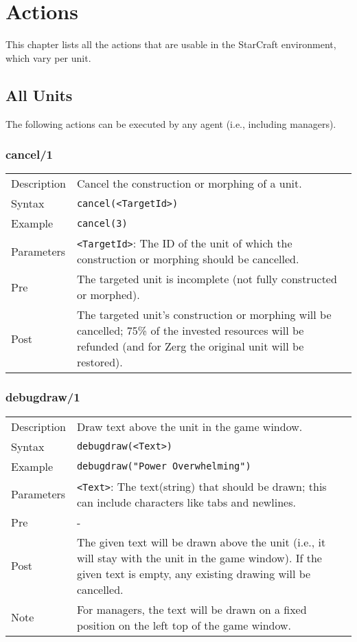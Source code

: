\chapter{Actions}

This chapter lists all the actions that are usable in the StarCraft environment, which vary per unit.

\section{All Units}
The following actions can be executed by any agent (i.e., including managers).

\subsection{cancel/1}
\begin{tabularx}{\textwidth}{lX}
 Description & Cancel the construction or morphing of a unit. \\
 Syntax & \verb|cancel(<TargetId>)| \\
 Example & \verb|cancel(3)| \\
 Parameters & \verb|<TargetId>|: The ID of the unit of which the construction or morphing should be cancelled. \\
 Pre & The targeted unit is incomplete (not fully constructed or morphed). \\
 Post & The targeted unit's construction or morphing will be cancelled; 75\% of the invested resources will be refunded (and for Zerg the original unit will be restored).
\end{tabularx}

\subsection{debugdraw/1}
\begin{tabularx}{\textwidth}{lX}
 Description & Draw text above the unit in the game window. \\
 Syntax & \verb|debugdraw(<Text>)| \\
 Example & \verb|debugdraw("Power Overwhelming")| \\
 Parameters & \verb|<Text>|: The text(string) that should be drawn; this can include characters like tabs and newlines. \\
 Pre & - \\
 Post & The given text will be drawn above the unit (i.e., it will stay with the unit in the game window). If the given text is empty, any existing drawing will be cancelled. \\
 Note & For managers, the text will be drawn on a fixed position on the left top of the game window.
\end{tabularx}

